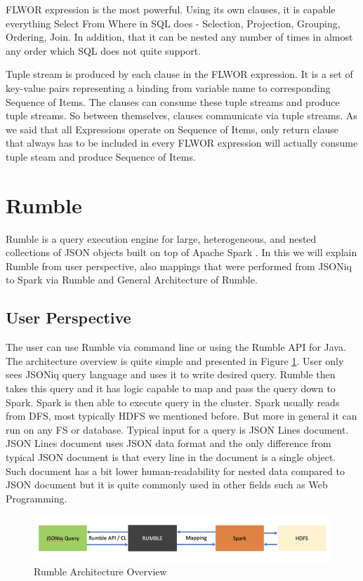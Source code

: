 FLWOR expression is the most powerful. Using its own clauses, it is capable everything Select From Where in SQL does - Selection, Projection, Grouping, Ordering, Join. In addition, that it can be nested any number of times in almost any order which SQL does not quite support. \cite{JSONiqBook}

Tuple stream is produced by each clause in the FLWOR expression. It is a set of key-value pairs representing a binding from variable name to corresponding Sequence of Items. The clauses can consume these tuple streams and produce tuple streams. So between themselves, clauses communicate via tuple streams. As we said that all Expressions operate on Sequence of Items, only return clause that always has to be included in every FLWOR expression will actually consume tuple steam and produce Sequence of Items. \cite{JSONiqBook}
   
\section{Rumble}
Rumble is a query execution engine for large, heterogeneous, and nested collections of JSON objects built on top of Apache Spark \cite{RumblePaper}. In this we will explain Rumble from user perspective, also mappings that were performed from JSONiq to Spark via Rumble and General Architecture of Rumble.
\subsection{User Perspective}
The user can use Rumble via command line or using the Rumble API for Java. The architecture overview is quite simple and presented in Figure \ref{fig:Rumble_Architecture}. User only sees JSONiq query language and uses it to write desired query. Rumble then takes this query and it has logic capable to map and pass the query down to Spark. Spark is then able to execute query in the cluster. Spark usually reads from DFS, most typically HDFS we mentioned before. But more in general it can run on any FS or database. Typical input for a query is JSON Lines document. JSON Lines document uses JSON data format and the only difference from typical JSON document is that every line in the document is a single object. Such document has a bit lower human-readability for nested data compared to JSON document but it is quite commonly used in other fields such as Web Programming. \cite{RumbleYouTube}

\begin{figure}[h!]
	\vspace*{-5mm}
	\includegraphics[width=\linewidth]{rumble_architecture.png}
	\vspace*{-10mm}
	\caption{Rumble Architecture Overview}
	\label{fig:Rumble_Architecture}
\end{figure}

